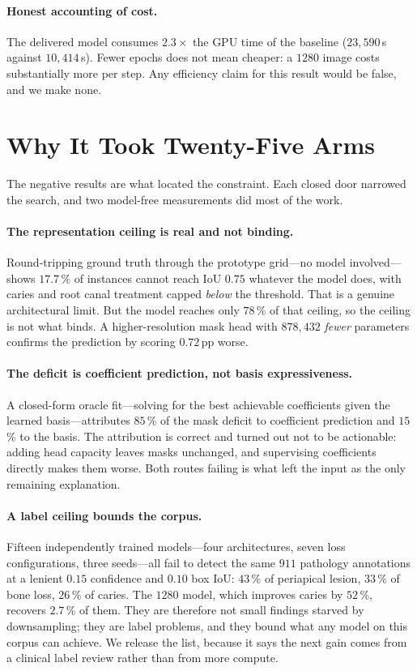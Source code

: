 \documentclass[10pt,twocolumn,letterpaper]{article}
\begin{document}
\paragraph{Honest accounting of cost.} The delivered model consumes
$2.3\times$ the GPU time of the baseline ($23{,}590$\,s against $10{,}414$\,s).
Fewer epochs does not mean cheaper: a $1280$ image costs substantially more per
step. Any efficiency claim for this result would be false, and we make none.

\section{Why It Took Twenty-Five Arms}
\label{sec:ceiling}

The negative results are what located the constraint. Each closed door narrowed
the search, and two model-free measurements did most of the work.

\paragraph{The representation ceiling is real and not binding.} Round-tripping
ground truth through the prototype grid---no model involved---shows $17.7$\,\% of
instances cannot reach IoU $0.75$ whatever the model does, with caries and root
canal treatment capped \emph{below} the threshold. That is a genuine architectural
limit. But the model reaches only $78$\,\% of that ceiling, so the ceiling is not
what binds. A higher-resolution mask head with $878{,}432$ \emph{fewer} parameters
confirms the prediction by scoring $0.72$\,pp worse.

\paragraph{The deficit is coefficient prediction, not basis expressiveness.} A
closed-form oracle fit---solving for the best achievable coefficients given the
learned basis---attributes $85$\,\% of the mask deficit to coefficient prediction
and $15$\,\% to the basis. The attribution is correct and turned out not to be
actionable: adding head capacity leaves masks unchanged, and supervising
coefficients directly makes them worse. Both routes failing is what left the
input as the only remaining explanation.

\paragraph{A label ceiling bounds the corpus.} Fifteen independently trained
models---four architectures, seven loss configurations, three seeds---all fail to
detect the same $911$ pathology annotations at a lenient $0.15$ confidence and
$0.10$ box IoU: $43$\,\% of periapical lesion, $33$\,\% of bone loss, $26$\,\% of
caries. The $1280$ model, which improves caries by $52$\,\%, recovers $2.7$\,\% of
them. They are therefore not small findings starved by downsampling; they are
label problems, and they bound what any model on this corpus can achieve. We
release the list, because it says the next gain comes from a clinical label review
rather than from more compute.
\end{document}
